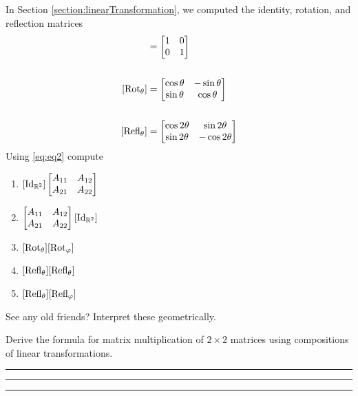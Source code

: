 \begin{qbox}
  In Section \ref{section:linearTransformation}, we computed the identity, rotation, and reflection matrices
  \begin{align*}
    [\id_{\bbr^2}] &= \begin{bmatrix} 1 & 0 \\ 0 & 1 \end{bmatrix} \\\\
    [\rot] &= \begin{bmatrix} \cos \theta & -\sin \theta \\ \sin \theta & \cos \theta \end{bmatrix}\\\\
    [\refl] &= \begin{bmatrix} \cos 2\theta & \sin 2\theta \\ \sin 2\theta & -\cos 2\theta \end{bmatrix}
  \end{align*}
  Using \eqref{eq:eq2} compute
  \begin{multicols}{2}
    \begin{enumerate}
      \item $[\id_{\bbr^2}] \begin{bmatrix} A_{11} & A_{12} \\ A_{21} & A_{22} \end{bmatrix}$
      \item $ \begin{bmatrix} A_{11} & A_{12} \\ A_{21} & A_{22} \end{bmatrix} [\id_{\bbr^2}]$
      \item $ [\rot] [\rot[\varphi]] $
      \item $[\refl] [\refl]$
      \item $[\refl] [\refl[\varphi]]$
    \end{enumerate}
  \end{multicols}
  See any old friends? Interpret these geometrically.
\end{qbox}

\begin{qbox}[Optional] Derive the formula for matrix multiplication of $2 \times 2$ matrices using compositions of linear transformations.
\end{qbox}

\hrule
\hrule
\hrule

